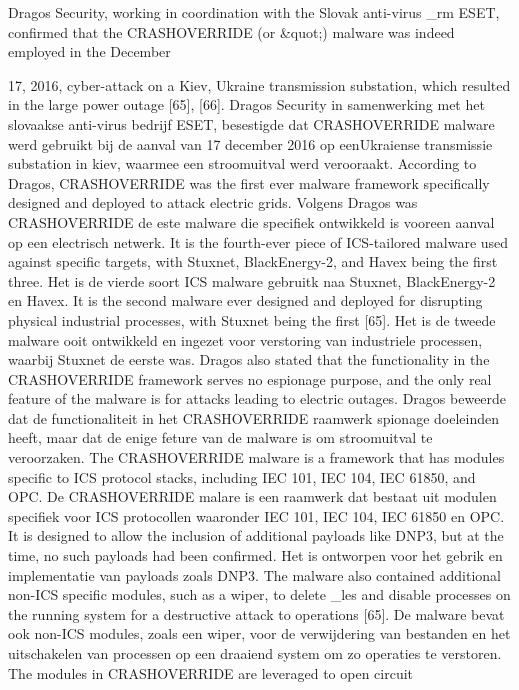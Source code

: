 		Dragos Security, working in coordination with the Slovak anti-virus _rm ESET, confirmed that
		the CRASHOVERRIDE (or \Industroyer&quot;) malware was indeed employed in the December
		
		17, 2016, cyber-attack on a Kiev, Ukraine transmission substation, which resulted in the
		large power outage [65], [66]. Dragos Security in samenwerking met het slovaakse anti-virus
		bedrijf ESET, besestigde dat CRASHOVERRIDE malware werd gebruikt bij de aanval van 17
		december 2016 op eenUkraiense transmissie substation in kiev, waarmee een stroomuitval
		werd verooraakt.
		According to Dragos, CRASHOVERRIDE was the first ever malware framework specifically
		designed and deployed to attack electric grids. Volgens Dragos was CRASHOVERRIDE de
		este malware die specifiek ontwikkeld is vooreen aanval op een electrisch netwerk.
		It is the fourth-ever piece of ICS-tailored malware used against specific targets, with Stuxnet,
		BlackEnergy-2, and Havex being the first three. Het is de vierde soort ICS malware gebruitk
		naa Stuxnet, BlackEnergy-2 en Havex.
		It is the second malware ever designed and deployed for disrupting physical industrial
		processes, with Stuxnet being the first [65]. Het is de tweede malware ooit ontwikkeld en
		ingezet voor verstoring van industriele processen, waarbij Stuxnet de eerste was.
		Dragos also stated that the functionality in the CRASHOVERRIDE framework serves no
		espionage purpose, and the only real feature of the malware is for attacks leading to electric
		outages. Dragos beweerde dat de functionaliteit in het CRASHOVERRIDE raamwerk
		spionage doeleinden heeft, maar dat de enige feture van de malware is om stroomuitval te
		veroorzaken.
		The CRASHOVERRIDE malware is a framework that has modules specific to ICS protocol
		stacks, including IEC 101, IEC 104, IEC 61850, and OPC. De CRASHOVERRIDE malare is
		een raamwerk dat bestaat uit modulen specifiek voor ICS protocollen waaronder IEC 101,
		IEC 104, IEC 61850 en OPC.
		It is designed to allow the inclusion of additional payloads
		like DNP3, but at the time, no such payloads had been confirmed. Het is ontworpen voor het
		gebrik en implementatie van payloads zoals DNP3.
		The malware also contained additional non-ICS specific modules, such as a
		wiper, to delete _les and disable processes on the running system for a
		destructive attack to operations [65]. De malware bevat ook non-ICS modules, zoals een
		wiper, voor de verwijdering van bestanden en het uitschakelen van processen op een
		draaiend system om zo operaties te verstoren.
		The modules in CRASHOVERRIDE are leveraged to open circuit
